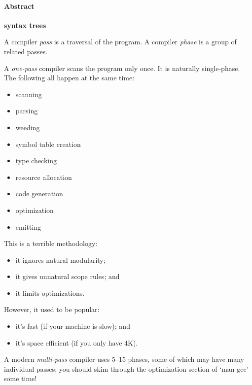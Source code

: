 



\begin{slide*}
\begin{tabbing}
~\\
{\Huge\bf Abstract}\\ ~\\ {\Huge\bf syntax trees}\\
\end{tabbing}

\begin{center}
\end{center}

\vfil
\end{slide*}

\begin{slide*}
A compiler {\em pass} is a traversal of the program.
A compiler {\em phase} is a group of related passes.

A {\em one-pass} compiler scans the program only once.  It is
naturally single-phase.  The following all happen at the same time:

\begin{itemize}
\item scanning
\item parsing
\item weeding
\item symbol table creation
\item type checking
\item resource allocation
\item code generation
\item optimization
\item emitting
\end{itemize}
\vfil
\end{slide*}

\begin{slide*}
This is a terrible methodology:
\begin{itemize}
\item it ignores natural modularity;
\item it gives unnatural scope rules; and
\item it limits optimizations.
\end{itemize}

However, it used to be popular:
\begin{itemize}
\item it's fast (if your machine is slow); and
\item it's space efficient (if you only have 4K).
\end{itemize}

A modern {\em multi-pass} compiler uses 5--15 phases, some of which
may have many individual passes: you should skim through the
optimization section of `man gcc' some time!
\vfil
\end{slide*}
 
